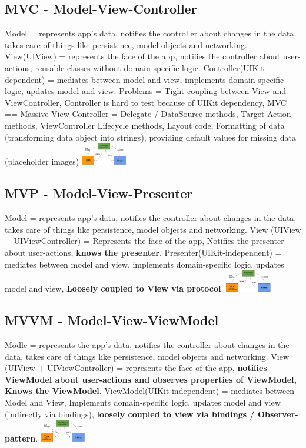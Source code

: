 \subsection{MVC -  Model-View-Controller}
Model = represents app's data, notifies the controller about changes in the data, takes care of things like persistence, model objects and networking. View(UIView) = represents the face of the app, notifies the controller about user-actions, reusable classes without domain-specific logic. Controller(UIKit-dependent) = mediates between model and view, implements domain-specific logic, updates model and view. Problems = Tight coupling between View and ViewController, Controller is hard to test because of UIKit dependency, MVC == Massive View Controller = Delegate / DataSource methods, Target-Action methods, ViewController Lifecycle methods, Layout code, Formatting of data (transforming data object into strings), providing default values for missing data (placeholder images)
\includegraphics[width=0.15\textwidth]{mvc.png}

\subsection{MVP - Model-View-Presenter}
Model = represents app's data, notifies the controller about changes in the data, takes care of things like persistence, model objects and networking. View (UIView + UIViewController) = Represents the face of the app, Notifies the presenter about user-actions, \textbf{knows the presenter}. Presenter(UIKit-independent) = mediates between model and view, implements domain-specific logic, updates model and view, \textbf{Loosely coupled to View via protocol}.
\includegraphics[width=0.15\textwidth]{mvp.png}

\subsection{MVVM - Model-View-ViewModel}
Modle = represents the app's data, notifies the controller about changes in the data, takes care of things like persistence, model objects and networking. View (UIView + UIViewController) = represents the face of the app, \textbf{notifies ViewModel about user-actions and observes properties of ViewModel, Knows the ViewModel}. ViewModel(UIKit-independent) = mediates between Model and View, Implements domain-specific logic, updates model and view (indirectly via bindings), \textbf{loosely coupled to view via bindings / Observer-pattern}.
\includegraphics[width=0.15\textwidth]{mvvm.png}

